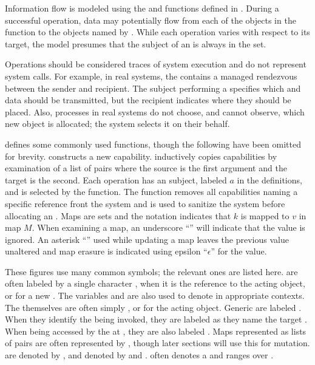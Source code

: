 Information flow is modeled using the \NMreadFrom{} and \NMwroteTo{} functions defined in .
During a successful operation, data may potentially flow from each of the objects in the \NMreadFrom{} function to the objects named by \NMwroteTo{}.
While each operation varies with respect to its target, the model presumes that the \TMacting{} subject of an \TMop{} is always in the \NMreadFrom{} set.

Operations should be considered traces of system execution and do not represent system calls.
For example, in real systems, the \term{\TMsend{}} \TMop{} contains a managed rendezvous between the sender and recipient.
The \TMacting{} subject performing a \TMsend{} \TMop{} specifies which \TMcaps{} and data should be transmitted, but the recipient indicates where they should be placed.
Also, processes in real systems do not choose, and cannot observe, which new object is allocated; the system selects it on their behalf.

 defines some commonly used functions, though the following have been omitted for brevity.
\NMmkCap{} constructs a new capability.
\NMcapTx{} inductively copies capabilities by examination of a list of \TMidx{} pairs where the source is the first argument and the target is the second.
Each operation has an \TMacting{} subject, labeled \(a\) in the definitions, and is selected by the \NMactor{} function.
The \NMremoveCapsByRef{} function removes all capabilities naming a specific reference front the system and is used to sanitize the system before allocating an \TMobj{}.
Maps are sets and the notation  indicates that \(k\) is mapped to \(v\) in map \(M\).
When examining a map, an underscore ``\ident{\_}'' will indicate that the value is ignored.
An asterisk ``\noident{*}'' used while updating a map leaves the previous value unaltered and map erasure is indicated using epsilon ``\(\epsilon\)'' for the value.

These figures use many common symbols; the relevant ones are listed here.
\xmakefirstuc{\TMrefs} are often labeled by a single character ,  when it is the reference to the acting object, or  for a new \TMref{}.
The variables  and  are also used to denote \TMrefs{} in appropriate contexts.
The \TMobjs{} themselves are often simply , or  for the acting object.
Generic \TMidxs{} are labeled .
When they identify the \TMcap{} being invoked, they are labeled  as they name the target \TMobj{}.
When being accessed by the \TMcap{} at , they are also labeled .
Maps represented as lists of \TMidx{} pairs are often represented by , though later sections will use this for mutation.
\xmakefirstuc{\TMsystemStates} are denoted by , and \TMaccessGraphs{} denoted by  and .
 often denotes a \TMpotAccAG{} and  ranges over \TMdirAccAGs{}.

